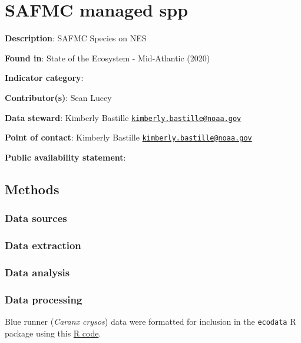 \documentclass[
]{book}
\begin{document}
\hypertarget{safmc-managed-spp}{%
\chapter{SAFMC managed spp}\label{safmc-managed-spp}}

\textbf{Description}: SAFMC Species on NES

\textbf{Found in}: State of the Ecosystem - Mid-Atlantic (2020)

\textbf{Indicator category}:

\textbf{Contributor(s)}: Sean Lucey

\textbf{Data steward}: Kimberly Bastille \href{mailto:kimberly.bastille@noaa.gov}{\nolinkurl{kimberly.bastille@noaa.gov}}

\textbf{Point of contact}: Kimberly Bastille \href{mailto:kimberly.bastille@noaa.gov}{\nolinkurl{kimberly.bastille@noaa.gov}}

\textbf{Public availability statement}:

\hypertarget{methods-31}{%
\section{Methods}\label{methods-31}}

\hypertarget{data-sources-31}{%
\subsection{Data sources}\label{data-sources-31}}

\hypertarget{data-extraction-27}{%
\subsection{Data extraction}\label{data-extraction-27}}

\hypertarget{data-analysis-29}{%
\subsection{Data analysis}\label{data-analysis-29}}

\hypertarget{data-processing-22}{%
\subsection{Data processing}\label{data-processing-22}}

Blue runner (\emph{Caranx crysos}) data were formatted for inclusion in the \texttt{ecodata} R package using this \href{https://github.com/NOAA-EDAB/ecodata/blob/master/data-raw/get_blue_runner.R}{R code}.
\end{document}
